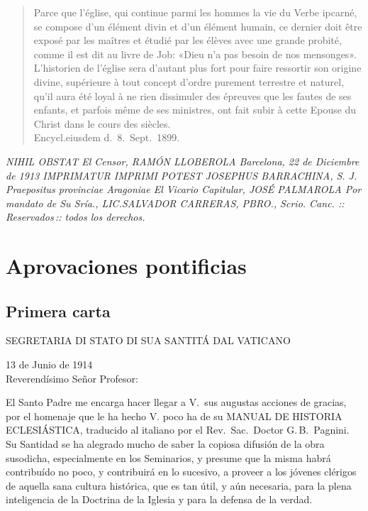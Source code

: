 \raggedbottom{} \documentclass[12pt, a4paper]{book}
\begin{document}
\begin{quotation}
  Parce que l'église, qui continue parmi les hommes la vie du Verbe ipcarné, se compose d'un élément divin et d'un élément humain, ce dernier doit être exposé par les maîtres et étudié par les élèves avec une grande probité, comme il est dit au livre de Job: «Dieu n'a pas besoin de nos mensonges». L'historien de l'église sera d'autant plus fort pour faire ressortir son origine divine, supérieure à tout concept d'ordre purement terrestre et naturel, qu'il aura été loyal à ne rien dissimuler des épreuves que les fautes de ses enfants, et parfois même de ses ministres, ont fait subir à cette Epouse du Christ dans le cours des siècles.\\
  Encycl.\@ eiusdem d.\ 8.\ Sept.\ 1899.
\end{quotation}
\textit{
  \noindent NIHIL OBSTAT El Censor, RAMÓN LLOBEROLA Barcelona, 22 de Diciembre de 1913 IMPRIMATUR IMPRIMI POTEST JOSEPHUS BARRACHINA, S. J. Praepositus provinciae Aragoniae El Vicario Capitular, JOSÉ PALMAROLA Por mandato de Su Sría., LIC.\@ SALVADOR CARRERAS, PBRO., Scrio. Canc. \quad::\, Reservados\,:: \quad todos los derechos.
}
\newpage
\section{Aprovaciones pontificias}
\subsection{Primera carta}
\begin{center}
  \large SEGRETARIA DI STATO DI SUA SANTITÁ DAL VATICANO
\end{center}
\begin{flushright}
  13 de Junio de 1914\\
  Reverendísimo Señor Profesor:
\end{flushright}

El Santo Padre me encarga hacer llegar a V.\ sus augustas acciones de gracias, por el homenaje que le ha hecho V. poco ha de su MANUAL DE HISTORIA ECLESIÁSTICA, traducido al italiano por el Rev.\, Sac.\, Doctor G.\,B.\, Pagnini. Su Santidad se ha alegrado mucho de saber la copiosa difusión de la obra susodicha, especialmente en los Seminarios, y presume que la misma habrá contribuído no poco, y contribuirá en lo sucesivo, a proveer a los jóvenes clérigos de aquella sana cultura histórica, que es tan útil, y aún necesaria, para la plena inteligencia de la Doctrina de la Iglesia y para la defensa de la verdad.
\end{document}
